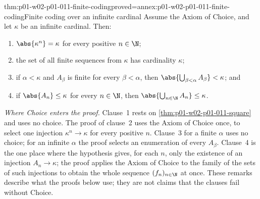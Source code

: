 \begin{hbtheorem}{thm:p01-w02-p01-011-finite-coding}{proved=annex:p01-w02-p01-011-finite-coding}{Finite coding over an infinite cardinal}
Assume the Axiom of Choice, and let \(\kappa\) be an infinite cardinal.
Then:
\begin{enumerate}
  \item \(\abs{\kappa^n}=\kappa\) for every positive \(n\in\N\);
  \item the set of all finite sequences from \(\kappa\) has cardinality
        \(\kappa\);
  \item if \(\alpha<\kappa\) and \(A_\beta\) is finite for every
        \(\beta<\alpha\), then
        \(\abs{\bigcup_{\beta<\alpha}A_\beta}<\kappa\); and
  \item if \(\abs{A_n}\leq\kappa\) for every \(n\in\N\), then
        \(\abs{\bigcup_{n\in\N}A_n}\leq\kappa\).
\end{enumerate}
\end{hbtheorem}

\emph{Where Choice enters the proof.} Clause~1 rests on
\cref{thm:p01-w02-p01-011-square} and uses no choice. The proof of clause~2
uses the Axiom of Choice once, to select one injection
\(\kappa^n\to\kappa\) for every positive \(n\). Clause~3 for a finite
\(\alpha\) uses no choice; for an infinite \(\alpha\) the proof selects an
enumeration of every \(A_\beta\). Clause~4 is the one place where the
hypothesis gives, for each \(n\), only the existence of an injection
\(A_n\to\kappa\); the proof applies the Axiom of Choice to the family of the
sets of such injections to obtain the whole sequence
\((f_n)_{n\in\N}\) at once. These remarks describe what the proofs below use;
they are not claims that the clauses fail without Choice.

